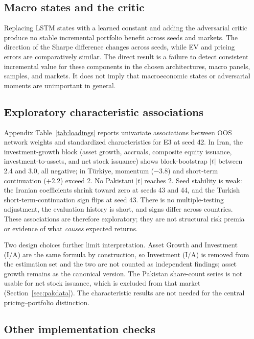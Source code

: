 \documentclass[12pt]{article}
\begin{document}
\subsection{Macro states and the critic}

Replacing LSTM states with a learned constant and adding the adversarial critic produce no stable incremental portfolio benefit across seeds and markets. The direction of the Sharpe difference changes across seeds, while EV and pricing errors are comparatively similar. The direct result is a failure to detect consistent incremental value for these components in the chosen architectures, macro panels, samples, and markets. It does not imply that macroeconomic states or adversarial moments are unimportant in general.

\subsection{Exploratory characteristic associations}\label{sec:loadings}

Appendix Table~\ref{tab:loadings} reports univariate associations between OOS network weights and standardized characteristics for E3 at seed 42. In Iran, the investment-growth block (asset growth, accruals, composite equity issuance, investment-to-assets, and net stock issuance) shows block-bootstrap $|t|$ between 2.4 and 3.0, all negative; in T\"urkiye, momentum ($-3.8$) and short-term continuation ($+2.2$) exceed 2. No Pakistani $|t|$ reaches 2. Seed stability is weak: the Iranian coefficients shrink toward zero at seeds 43 and 44, and the Turkish short-term-continuation sign flips at seed 43. There is no multiple-testing adjustment, the evaluation history is short, and signs differ across countries. These associations are therefore exploratory; they are not structural risk premia or evidence of what \emph{causes} expected returns.

Two design choices further limit interpretation. Asset Growth and Investment (I/A) are the same formula by construction, so Investment (I/A) is removed from the estimation set and the two are not counted as independent findings; asset growth remains as the canonical version. The Pakistan share-count series is not usable for net stock issuance, which is excluded from that market (Section~\ref{sec:pakdata}). The characteristic results are not needed for the central pricing--portfolio distinction.

\subsection{Other implementation checks}
\end{document}
